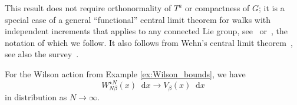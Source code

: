 \documentclass[11pt]{preprint}
\newcommand{\mrd}{\mathop{}\!\mathrm{d}}
\begin{document}
\begin{remark}
This result does not require orthonormality of $T^a$ or compactness of $G$;
it is a special case of a general ``functional'' central limit theorem for walks with independent increments that applies to any connected Lie group, see~\cite{Feinsilver78,Stroock_Varadhan_73,jorgensen1975central}
or~\cite[Sec.~2.2]{Chevyrev18}, the notation of which we follow.
It also follows from Wehn's central limit theorem~\cite{Wehn_thesis,Wehn62,Grenander63}, see also the survey~\cite{Breuillard_07}.
\end{remark}

\begin{proposition}\label{prop:Wilson_conv}
For the Wilson action from Example \ref{ex:Wilson_bounds}, we have
\[
W_{N\beta}^{\star N}(x) \mrd x \to V_\beta(x)\mrd x
\]
in distribution as $N\to\infty$.
\end{proposition}
\end{document}
